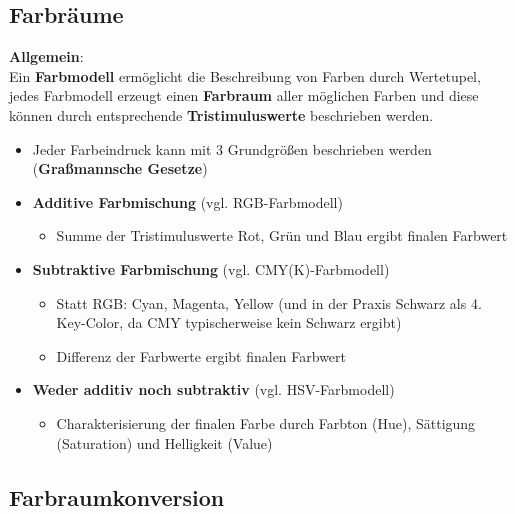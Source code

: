 \documentclass[10pt,a4paper]{article}
\begin{document}
	\subsection{Farbräume}
	\label{sub:farbraeume}

	\textbf{Allgemein}:\\
	Ein \textbf{Farbmodell} ermöglicht die Beschreibung von Farben durch Wertetupel, jedes Farbmodell erzeugt einen \textbf{Farbraum} aller möglichen Farben und diese können durch entsprechende \textbf{Tristimuluswerte} beschrieben werden.

	\begin{itemize}
		\item Jeder Farbeindruck kann mit 3 Grundgrößen beschrieben werden (\textbf{Graßmannsche Gesetze})
		\item \textbf{Additive Farbmischung} (vgl. RGB-Farbmodell)
		\begin{itemize}
			\item Summe der Tristimuluswerte Rot, Grün und Blau ergibt finalen Farbwert
		\end{itemize}
		\item \textbf{Subtraktive Farbmischung} (vgl. CMY(K)-Farbmodell)
		\begin{itemize}
			\item Statt RGB: Cyan, Magenta, Yellow (und in der Praxis Schwarz als 4. Key-Color, da CMY typischerweise kein Schwarz ergibt)
			\item Differenz der Farbwerte ergibt finalen Farbwert
		\end{itemize}
		\item \textbf{Weder additiv noch subtraktiv} (vgl. HSV-Farbmodell)
		\begin{itemize}
			\item Charakterisierung der finalen Farbe durch Farbton (Hue), Sättigung (Saturation) und Helligkeit (Value)
		\end{itemize}
	\end{itemize}

	\newpage
	\subsection{Farbraumkonversion}
	\label{sub:farbraumkonversion}
\end{document}
